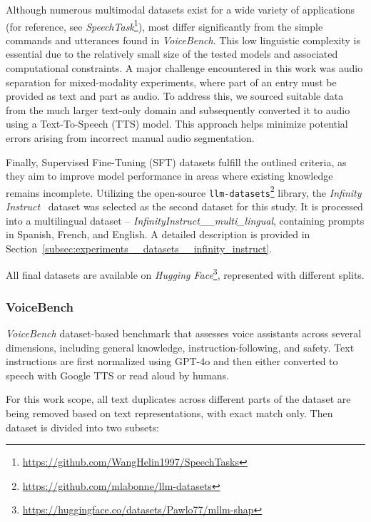 \begin{appendices}
    Although numerous multimodal datasets exist for a wide variety of applications (for reference, see \textit{SpeechTask}\footnote{\url{https://github.com/WangHelin1997/SpeechTasks}}), most differ significantly from the simple commands and utterances found in \textit{VoiceBench}. This low linguistic complexity is essential due to the relatively small size of the tested models and associated computational constraints. A major challenge encountered in this work was audio separation for mixed-modality experiments, where part of an entry must be provided as text and part as audio. To address this, we sourced suitable data from the much larger text-only domain and subsequently converted it to audio using a Text-To-Speech (TTS) model. This approach helps minimize potential errors arising from incorrect manual audio segmentation.

    Finally, Supervised Fine-Tuning (SFT) datasets fulfill the outlined criteria, as they aim to improve model performance in areas where existing knowledge remains incomplete. Utilizing the open-source \texttt{llm-datasets}\footnote{\url{https://github.com/mlabonne/llm-datasets}} library, the \textit{Infinity Instruct}~\parencite{li2025infinityinstruct} dataset was selected as the second dataset for this study. It is processed into a multilingual dataset -- \textit{InfinityInstruct\_\_multi\_lingual}, containing prompts in Spanish, French, and English. A detailed description is provided in Section~\ref{subsec:experiments__datasets__infinity_instruct}.

    All final datasets are available on \textit{Hugging Face}\footnote{\url{https://huggingface.co/datasets/Pawlo77/mllm-shap}}, represented with different splits.

    \subsubsection{VoiceBench}
    \label{subsec:experiments__datasets__voice_bench}

    \textit{VoiceBench} \parencite{chen2024voicebench} dataset-based benchmark that assesses voice assistants across several dimensions, including general knowledge, instruction-following, and safety. Text instructions are first normalized using GPT-4o and then either converted to speech with Google TTS or read aloud by humans.

    For this work scope, all text duplicates across different parts of the dataset are being removed based on text representations, with exact match only. Then dataset is divided into two subsets:


\end{appendices}
